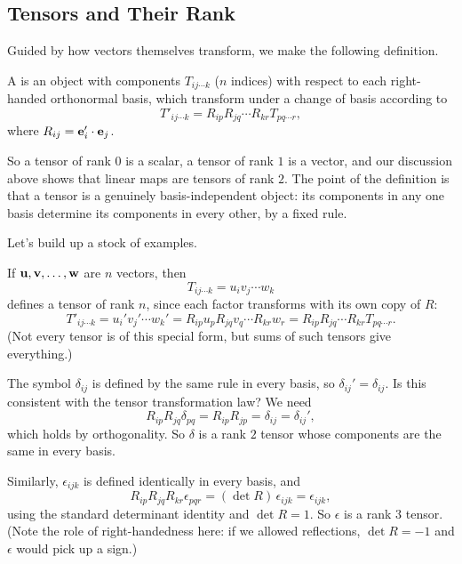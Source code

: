 \documentclass[a4paper]{scrartcl}
\begin{document}
\subsection{Tensors and Their Rank}

Guided by how vectors themselves transform, we make the following definition.

\begin{definition}
	A  is an object with components $T_{ij \cdots k}$ ($n$ indices) with respect to each right-handed orthonormal basis, which transform under a change of basis according to
	$$
	T'_{ij\cdots k} = R_{ip} R_{jq} \cdots R_{kr} T_{pq \cdots r},
	$$
	where $R_{ij} = \mathbf{e}_i' \cdot \mathbf{e}_j$.
\end{definition}

So a tensor of rank $0$ is a scalar, a tensor of rank $1$ is a vector, and our discussion above shows that linear maps are tensors of rank $2$. The point of the definition is that a tensor is a genuinely basis-independent object: its components in any one basis determine its components in every other, by a fixed rule.

Let's build up a stock of examples.

\begin{example}
	If $\mathbf{u}, \mathbf{v}, \dots, \mathbf{w}$ are $n$ vectors, then
	$$
	T_{ij \cdots k} = u_i v_j \cdots w_k
	$$
	defines a tensor of rank $n$, since each factor transforms with its own copy of $R$:
	$$
	T'_{ij\cdots k} = u_i' v_j' \cdots w_k' = R_{ip}u_p R_{jq} v_q \cdots R_{kr} w_r = R_{ip}R_{jq}\cdots R_{kr} T_{pq\cdots r}.
	$$
	(Not every tensor is of this special form, but sums of such tensors give everything.)
\end{example}

\begin{example}
	The symbol $\delta_{ij}$ is defined by the same rule in every basis, so $\delta_{ij}' = \delta_{ij}$. Is this consistent with the tensor transformation law? We need
	$$
	R_{ip}R_{jq} \delta_{pq} = R_{ip}R_{jp} = \delta_{ij} = \delta_{ij}',
	$$
	which holds by orthogonality. So $\delta$ is a rank $2$ tensor whose components are the same in every basis.
\end{example}

\begin{example}
	Similarly, $\epsilon_{ijk}$ is defined identically in every basis, and
	$$
	R_{ip}R_{jq}R_{kr} \epsilon_{pqr} = (\det R) \, \epsilon_{ijk} = \epsilon_{ijk},
	$$
	using the standard determinant identity and $\det R = 1$. So $\epsilon$ is a rank $3$ tensor. (Note the role of right-handedness here: if we allowed reflections, $\det R = -1$ and $\epsilon$ would pick up a sign.)
\end{example}
\end{document}
